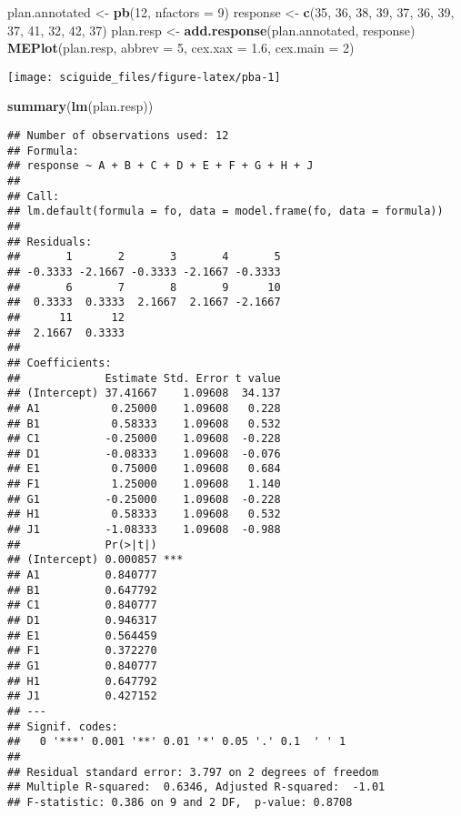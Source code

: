 \documentclass[]{tufte-book}
\newenvironment{Shaded}{}{}
\newcommand{\DataTypeTok}[1]{\textcolor[rgb]{0.56,0.13,0.00}{#1}}
\newcommand{\DecValTok}[1]{\textcolor[rgb]{0.25,0.63,0.44}{#1}}
\newcommand{\FloatTok}[1]{\textcolor[rgb]{0.25,0.63,0.44}{#1}}
\newcommand{\KeywordTok}[1]{\textcolor[rgb]{0.00,0.44,0.13}{\textbf{#1}}}
\newcommand{\NormalTok}[1]{#1}
\newcommand{\StringTok}[1]{\textcolor[rgb]{0.25,0.44,0.63}{#1}}
\begin{document}
\begin{Shaded}
\begin{Highlighting}[]
\NormalTok{plan.annotated <-}\StringTok{ }\KeywordTok{pb}\NormalTok{(}\DecValTok{12}\NormalTok{, }\DataTypeTok{nfactors =} \DecValTok{9}\NormalTok{)}
\NormalTok{response <-}\StringTok{ }\KeywordTok{c}\NormalTok{(}\DecValTok{35}\NormalTok{, }\DecValTok{36}\NormalTok{, }\DecValTok{38}\NormalTok{, }\DecValTok{39}\NormalTok{, }\DecValTok{37}\NormalTok{, }\DecValTok{36}\NormalTok{, }\DecValTok{39}\NormalTok{, }\DecValTok{37}\NormalTok{, }
    \DecValTok{41}\NormalTok{, }\DecValTok{32}\NormalTok{, }\DecValTok{42}\NormalTok{, }\DecValTok{37}\NormalTok{)}
\NormalTok{plan.resp <-}\StringTok{ }\KeywordTok{add.response}\NormalTok{(plan.annotated, response)}
\KeywordTok{MEPlot}\NormalTok{(plan.resp, }\DataTypeTok{abbrev =} \DecValTok{5}\NormalTok{, }\DataTypeTok{cex.xax =} \FloatTok{1.6}\NormalTok{, }\DataTypeTok{cex.main =} \DecValTok{2}\NormalTok{)}
\end{Highlighting}
\end{Shaded}

\texttt{[image: sciguide\_files/figure-latex/pba-1]}

\begin{Shaded}
\begin{Highlighting}[]
\KeywordTok{summary}\NormalTok{(}\KeywordTok{lm}\NormalTok{(plan.resp))}
\end{Highlighting}
\end{Shaded}

\begin{verbatim}
## Number of observations used: 12 
## Formula:
## response ~ A + B + C + D + E + F + G + H + J
## 
## Call:
## lm.default(formula = fo, data = model.frame(fo, data = formula))
## 
## Residuals:
##       1       2       3       4       5 
## -0.3333 -2.1667 -0.3333 -2.1667 -0.3333 
##       6       7       8       9      10 
##  0.3333  0.3333  2.1667  2.1667 -2.1667 
##      11      12 
##  2.1667  0.3333 
## 
## Coefficients:
##             Estimate Std. Error t value
## (Intercept) 37.41667    1.09608  34.137
## A1           0.25000    1.09608   0.228
## B1           0.58333    1.09608   0.532
## C1          -0.25000    1.09608  -0.228
## D1          -0.08333    1.09608  -0.076
## E1           0.75000    1.09608   0.684
## F1           1.25000    1.09608   1.140
## G1          -0.25000    1.09608  -0.228
## H1           0.58333    1.09608   0.532
## J1          -1.08333    1.09608  -0.988
##             Pr(>|t|)    
## (Intercept) 0.000857 ***
## A1          0.840777    
## B1          0.647792    
## C1          0.840777    
## D1          0.946317    
## E1          0.564459    
## F1          0.372270    
## G1          0.840777    
## H1          0.647792    
## J1          0.427152    
## ---
## Signif. codes:  
##   0 '***' 0.001 '**' 0.01 '*' 0.05 '.' 0.1  ' ' 1
## 
## Residual standard error: 3.797 on 2 degrees of freedom
## Multiple R-squared:  0.6346, Adjusted R-squared:  -1.01 
## F-statistic: 0.386 on 9 and 2 DF,  p-value: 0.8708
\end{verbatim}
\end{document}
